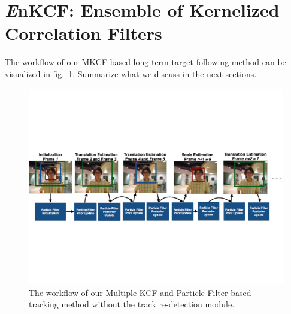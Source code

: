 \documentclass[10pt,twocolumn,letterpaper]{article}
\newcounter{ct}
\begin{document}
\section{{\it E}nKCF: Ensemble of Kernelized Correlation Filters}

The workflow of our MKCF based long-term target following method can
be visualized in fig.~\ref{Workflow_figure}. Summarize what we discuss
in the next sections.
\begin{figure}[!t]
\includegraphics[width=\textwidth]{figures/Workflow_MKCF+PF.pdf}
\caption{The workflow of our Multiple KCF and Particle Filter based tracking method without the track re-detection module.}
\label{Workflow_figure}
\end{figure}
\end{document}
